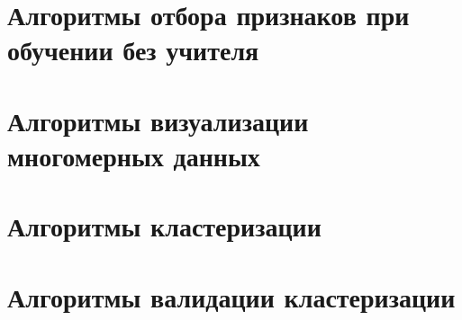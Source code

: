 

\section{Алгоритмы отбора признаков при обучении без учителя}



\section[Алгоритмы визуализации многомерных данных]{%
  Алгоритмы визуализации многомерных данных}



\section[Алгоритмы кластеризации]{%
  Алгоритмы кластеризации}




\section[Алгоритмы валидации кластеризации]{%
  Алгоритмы валидации кластеризации}

